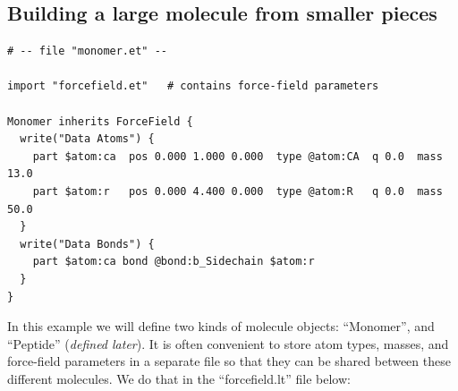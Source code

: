 \documentclass[11pt]{article}
\begin{document}
\pagebreak

\subsection{Building a large molecule from smaller pieces}
\label{sec:2bead}

\begin{verbatim}
# -- file "monomer.et" --

import "forcefield.et"   # contains force-field parameters

Monomer inherits ForceField {
  write("Data Atoms") {
    part $atom:ca  pos 0.000 1.000 0.000  type @atom:CA  q 0.0  mass 13.0 
    part $atom:r   pos 0.000 4.400 0.000  type @atom:R   q 0.0  mass 50.0
  }
  write("Data Bonds") {
    part $atom:ca bond @bond:b_Sidechain $atom:r
  }
}
\end{verbatim}



In this example we will define two kinds of molecule objects:
``Monomer'', and ``Peptide'' (\textit{defined later}).
It is often convenient to store atom types, masses, and force-field 
parameters in a separate file so that they
can be shared between these different molecules.
We do that in the ``forcefield.lt'' file below:
\end{document}
